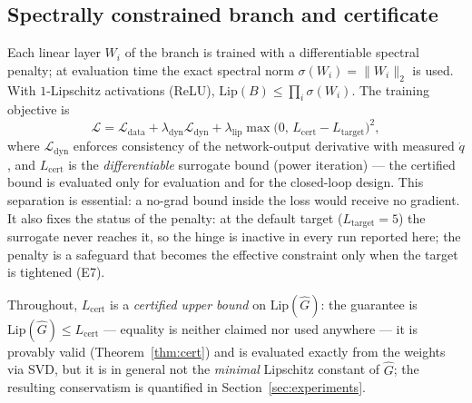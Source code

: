 \documentclass[11pt]{article}
\newcommand{\Ghat}{\hat{G}}
\newcommand{\Lhat}{L_{\mathrm{cert}}}
\newcommand{\Ltarget}{L_{\mathrm{target}}}
\begin{document}
\subsection{Spectrally constrained branch and certificate}
Each linear layer $W_i$ of the branch is trained with a differentiable
spectral penalty; at evaluation time the exact spectral norm
$\sigma(W_i)=\|W_i\|_2$ is used. With $1$-Lipschitz activations (ReLU),
$\mathrm{Lip}(B)\le\prod_i \sigma(W_i)$. The training objective is
\begin{equation}
  \mathcal{L} = \mathcal{L}_{\mathrm{data}}
  + \lambda_{\mathrm{dyn}}\mathcal{L}_{\mathrm{dyn}}
  + \lambda_{\mathrm{lip}}\max\!\big(0,\,\Lhat-\Ltarget\big)^2,
  \label{eq:loss}
\end{equation}
where $\mathcal{L}_{\mathrm{dyn}}$ enforces consistency of the network-output
derivative with measured $\dot q$, and $\Lhat$ is the \emph{differentiable}
surrogate bound (power iteration) --- the certified bound is evaluated
only for evaluation and for the closed-loop design. This separation is
essential: a no-grad bound inside the loss would receive no gradient. It also
fixes the status of the penalty: at the default target ($\Ltarget=5$) the
surrogate never reaches it, so the hinge is inactive in every run reported
here; the penalty is a safeguard that becomes the effective constraint only
when the target is tightened (E7).

Throughout, $\Lhat$ is a \emph{certified upper bound} on
$\mathrm{Lip}(\Ghat)$: the guarantee is $\mathrm{Lip}(\Ghat)\le\Lhat$ ---
equality is neither claimed nor used anywhere --- it is provably valid
(Theorem~\ref{thm:cert}) and is evaluated exactly from the weights via SVD,
but it is in general not the \emph{minimal} Lipschitz constant of $\Ghat$;
the resulting conservatism is quantified in Section~\ref{sec:experiments}.
\end{document}
